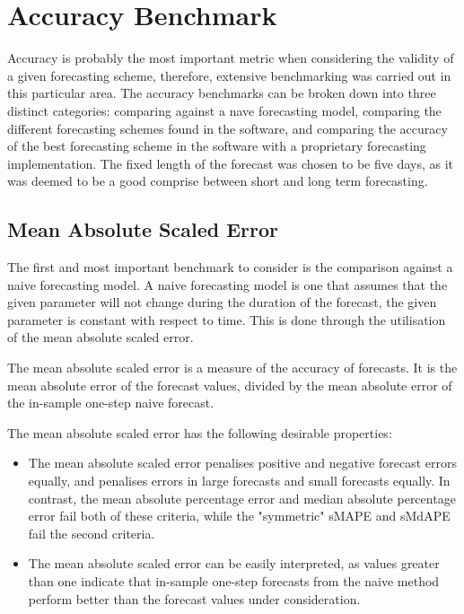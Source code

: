 \section{Accuracy Benchmark}
Accuracy is probably the most important metric when considering the validity of a given forecasting scheme, therefore, extensive benchmarking was carried out in this particular area. The accuracy benchmarks can be broken down into three distinct categories: comparing against a nave forecasting model, comparing the different forecasting schemes found in the software, and comparing the accuracy of the best forecasting scheme in the software with a proprietary forecasting implementation. The fixed length of the forecast was chosen to be five days, as it was deemed to be a good comprise between short and long term forecasting.

\subsection{Mean Absolute Scaled Error}
The first and most important benchmark to consider is the comparison against a naive forecasting model. A naive forecasting model is one that assumes that the given parameter will not change during the duration of the forecast, the given parameter is constant with respect to time. This is done through the utilisation of the mean absolute scaled error. 

\begin{definition}
The mean absolute scaled error is a measure of the accuracy of forecasts. It is the mean absolute error of the forecast values, divided by the mean absolute error of the in-sample one-step naive forecast.
\end{definition}

The mean absolute scaled error has the following desirable properties:

\begin{itemize}
    \item The mean absolute scaled error penalises positive and negative forecast errors equally, and penalises errors in large forecasts and small forecasts equally. In contrast, the mean absolute percentage error and median absolute percentage error fail both of these criteria, while the "symmetric" sMAPE and sMdAPE fail the second criteria.
    \item The mean absolute scaled error can be easily interpreted, as values greater than one indicate that in-sample one-step forecasts from the naive method perform better than the forecast values under consideration.
\end{itemize}

